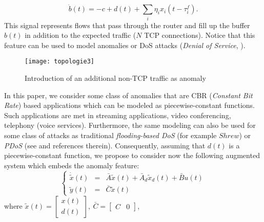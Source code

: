\documentclass[a4paper, 10pt, onecolumn]{article}
\begin{document}
\begin{equation*}
\dot{b}(t)=-c+d(t)+\sum_{i}\eta_ix_i(t-\tau_i^f).
\end{equation*}
This signal represents flows that pass through the router and fill up the buffer $b(t)$ in addition to the expected traffic ($N$ TCP connections). Notice that this feature can be used to model anomalies or DoS attacks ({\it Denial of Service}, \cite{cert}).
\begin{figure}
       \centerline{\texttt{[image: topologie3]}}
       \caption{Introduction of an additional non-TCP traffic as anomaly}
       \label{topologie3}
\end{figure}
 In this paper, we consider some class of anomalies that are CBR ({\it Constant Bit Rate}) based applications which can be modeled as piecewise-constant functions. Such applications are met in streaming applications, video conferencing, telephony (voice services). Furthermore, the same modeling can also be used for some class of attacks \cite{Luo05} as traditional {\it flooding-based DoS} (for example $Shrew$) or {\it PDoS} (see \cite{Luo05} and references therein). Consequently, assuming that $d(t)$ is a piecewise-constant function, we propose to consider now the following augmented system which embeds the anomaly feature:
\begin{equation}
\label{augmented-model}
\left\{\begin{array}{rcl}
\dot{\tilde{x}}(t)&=&\bar{A}\tilde{x}(t)+\bar{A}_d\tilde{x}_d(t)+\bar{B}u(t)\\
\tilde{y}(t)&=&\bar{C}\tilde{x}(t)
\end{array}\right.
\end{equation}
where $\tilde{x}(t)=\left[\begin{array}{c}x(t)\\ \hline d(t) \end{array}\right],~\bar{C}=\left[\begin{array}{c|c}C&0 \end{array}\right]$,
\end{document}
